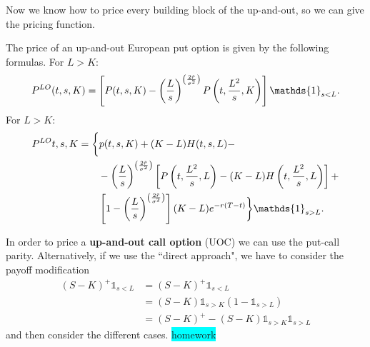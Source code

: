 Now we know how to price every building block of the up-and-out, so we can give the pricing function.
\begin{proposition}
    The price of an up-and-out European put option is given by the following formulas. For $L > K$:
    \begin{equation}
      P^{LO}(t,s,K) = \left[P(t,s,K)-\left(\frac{L}{s}\right)^{\left(\frac{2\Tilde{r}}{\sigma^2}\right)} P\left(t,\frac{L^2}{s},K\right)\right]\mathds{1}_{s<L}.
    \end{equation}
    For $L>K$:
    \begin{align}
        \notag P^{LO}{t,s,K} &= \bigg\{p(t,s,K) + (K-L)H(t,s,L) - \\
        &\qquad
        \notag - \left(\frac{L}{s}\right)^{\left(\frac{2\Tilde{r}}{\sigma^2}\right)}
        \left[P\left(t,\frac{L^2}{s},L\right) - (K-L) H\left(t,\frac{L^2}{s},L\right)\right] +\\
        &\qquad
        \left[1-\left(\frac{L}{s}\right)^{\left(\frac{2\Tilde{r}}{\sigma^2}\right)}\right] (K-L)e^{-r(T-t)}\bigg\}\mathds{1}_{s>L}.
    \end{align}
\end{proposition}
In order to price a \textbf{up-and-out call option} (UOC) we can use the put-call parity. Alternatively, if we use the ``direct approach", we have to consider the payoff modification
\begin{align*}
    (S-K)^+\mathds{1}_{s<L} &= (S-K)^+\mathds{1}_{s<L} \\
    &=
    (S-K)\mathds{1}_{s>K}(1-\mathds{1}_{s>L}) \\
    &=
    (S-K)^+ - (S-K)\mathds{1}_{s>K}\mathds{1}_{s>L}
\end{align*}
and then consider the different cases. \colorbox{cyan}{homework}

